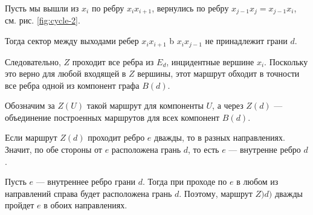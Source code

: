Пусть мы вышли из $x_i$ по ребру $x_ix_{i+1}$, вернулись по ребру $x_{j-1} x_j  = x_{j-1}x_i$, см. рис. \ref{fig:cycle-2}.

Тогда сектор между выходами ребер $x_i x_{i+1}$ b $x_i x_{j-1}$ не принадлежит грани $d$.

Следовательно, $Z$ проходит все ребра из $E_d$, инцидентные вершине $x_i$. Поскольку это верно для любой входящей в $Z$ вершины, этот маршрут обходит в точности все ребра одной из компонент графа $B(d)$.

Обозначим за $Z(U)$ такой маршрут для компоненты $U$, а через $Z(d)$ --- объединение построенных маршрутов для всех компонент $B(d)$.

Если маршрут $Z(d)$ проходит ребро $e$ дважды, то в разных направлениях. Значит, по обе стороны от $e$ расположена грань $d$, то есть $e$ --- внутренне ребро $d$.

Пусть $e$ --- внутреннее ребро грани $d$. Тогда при проходе по $e$ в любом из направлений справа будет расположена грань $d$. Поэтому, маршрут $Z)d)$ дважды пройдет $e$ в обоих направлениях.
